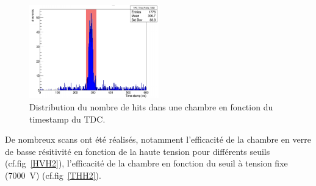 \begin{figure}[!ht]
	\centering
	\includegraphics[width=0.50\textwidth]{GLA/STRUCH2.png}
	\caption{Distribution du nombre de hits dans une chambre en fonction du timestamp du TDC.}
	\label{struch2}
\end{figure}

De nombreux scans ont été réalisés, notamment l'efficacité de la chambre en verre de basse résitivité en fonction de la haute tension pour différents seuils (cf.fig~\ref{HVH2}), l'efficacité de la chambre en fonction du seuil à tension fixe (\SI{7000}{\volt}) (cf.fig~\ref{THH2}).

